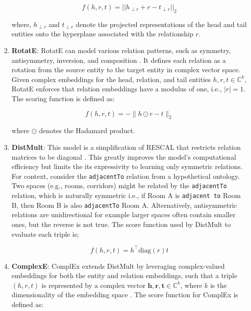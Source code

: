 \begin{enumerate}
     \begin{equation}
        f(h, r, t) = ||h_{\perp r} + r - t_{\perp r}||_2
    \end{equation}
    
    where, $h_{\perp r}$ and $t_{\perp r}$ denote the projected representations of the head and tail entities onto the hyperplane associated with the relationship $r$.
    
    \item
    \textbf{RotatE}: RotatE can model various relation patterns, such as symmetry, antisymmetry, inversion, and composition \citep{Sun2019RotatE:Space}. It defines each relation as a rotation from the source entity to the target entity in complex vector space. Given  complex embeddings for the head, relation, and tail entities \(h, r, t \in \mathbb{C}^k\), RotatE enforces that relation embeddings have a modulus of one, i.e., \(|r| = 1\). The scoring function is defined as:
    
    \begin{equation}
    f(h, r, t) = -\| h \odot r - t \|_2
    \end{equation}
    
    where \(\odot\) denotes the Hadamard product.

    \item
    \textbf{DistMult}: This model is a simplification of RESCAL \citep{Nickel2013TensorLearning} that restricts relation matrices to be diagonal \citep{Yang2014EmbeddingBases}. This greatly improves the model's computational efficiency but limits the its expressivity to learning only symmetric relations. For context, consider the \texttt{adjacentTo} relation from a hypothetical ontology. Two spaces (e.g., rooms, corridors) might be related by the \texttt{adjacentTo} relation, which is naturally symmetric i.e., if Room A is \texttt{adjacent to} Room B, then Room B is also \texttt{adjacentTo} Room A. Alternatively, antisymmetric relations are unidirectional for example larger spaces often contain smaller ones, but the reverse is not true. The score function used by DistMult to evaluate each triple is;
    
    \begin{equation}
    f(h, r, t) = h^\top \text{diag}(r)t
    \end{equation}

    \item
    \textbf{ComplexE}: ComplEx extends DistMult by leveraging complex-valued embeddings for both the entity and relation embeddings, such that a triple \( (h, r, t) \) is represented by a complex vector \( \textbf{h}, \textbf{r}, \textbf{t} \in \mathbb{C}^k \), where \( k \) is the dimensionality of the embedding space \citep{Trouillon2016ComplexPrediction}. The score function for ComplEx is defined as:


\end{enumerate}
